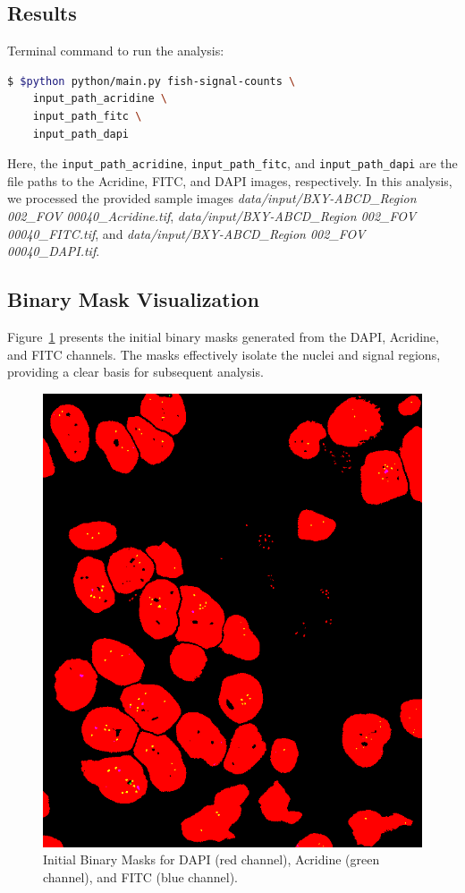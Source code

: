 \documentclass[a4paper,12pt]{article}
\begin{document}
\subsection{Results}

Terminal command to run the analysis:

\begin{lstlisting}[language=bash]
$ $python python/main.py fish-signal-counts \
    input_path_acridine \
    input_path_fitc \
    input_path_dapi
\end{lstlisting}

Here, the \texttt{input\_path\_acridine}, \texttt{input\_path\_fitc}, and \texttt{input\_path\_dapi} are the file paths to the Acridine, FITC, and DAPI images, respectively. In this analysis, we processed the provided sample images \textit{data/input/BXY-ABCD\_Region 002\_FOV 00040\_Acridine.tif}, \textit{data/input/BXY-ABCD\_Region 002\_FOV 00040\_FITC.tif}, and \textit{data/input/BXY-ABCD\_Region 002\_FOV 00040\_DAPI.tif}.

\subsection{Binary Mask Visualization}

Figure~\ref{fig:cell_binary_masks} presents the initial binary masks generated from the DAPI, Acridine, and FITC channels. The masks effectively isolate the nuclei and signal regions, providing a clear basis for subsequent analysis.

\begin{figure}[h]
    \centering
    \includegraphics[width=0.5\linewidth]{data/output/fish_signal_counts/binary_masks.png}
    \caption{Initial Binary Masks for DAPI (red channel), Acridine (green channel), and FITC (blue channel).}
    \label{fig:cell_binary_masks}
\end{figure}
\end{document}

